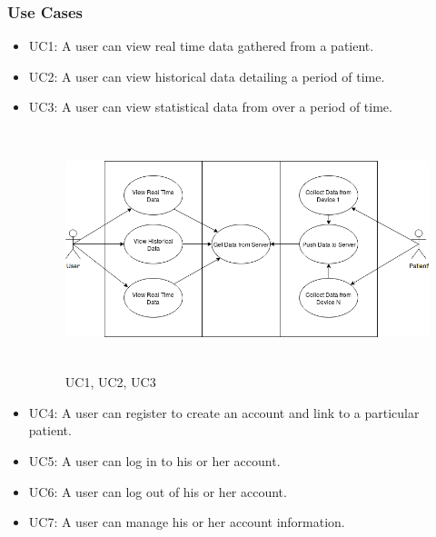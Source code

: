\subsubsection{Use Cases}

\begin{itemize}
	\item UC1: A user can view real time data gathered from a patient.

	\item UC2: A user can view historical data detailing a period of time.
	
	\item UC3: A user can view statistical data from over a period of time.
\begin{center}
\begin{figure}[!htb]
	\includegraphics[width=15cm, height=7cm]{Diagrams/UseCase123.png}
	\caption{UC1, UC2, UC3}
\end{figure}
\end{center}
	
	\item UC4: A user can register to create an account and link to a particular patient.
	
	\item UC5: A user can log in to his or her account.
	
	\item UC6: A user can log out of his or her account.
	
	\item UC7: A user can manage his or her account information.		


\end{itemize}
